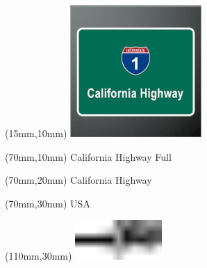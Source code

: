 \null\newpage
\begin{textblock*}{50mm}(15mm,10mm)%
\includegraphics[width=50mm]{LG/2015-05-20_00077.png}
\end{textblock*}
\begin{textblock*}{130mm}(70mm,10mm)%
{\fontsize{20}{20}\selectfont California Highway Full}\\
\end{textblock*}
\begin{textblock*}{120mm}(70mm,20mm)%
{\fontsize{16}{16}\selectfont California Highway}\\
\end{textblock*}
\begin{textblock*}{120mm}(70mm,30mm)%
{\fontsize{12}{12}\selectfont USA}
\end{textblock*}
\begin{textblock*}{30mm}(110mm,30mm)%
\centering
\includegraphics[height=15mm]{icons/tofinish.pdf}
\end{textblock*}
